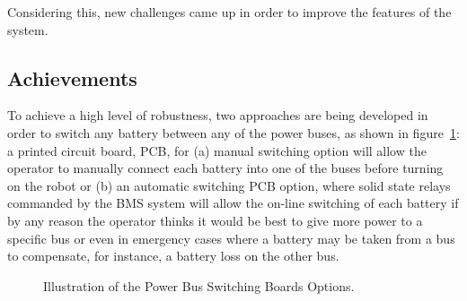 \documentclass{ifacconf}
\begin{document}
Considering this, new challenges came up in order to improve the features of
the system.

\subsection{Achievements}

To achieve a high level of robustness, two approaches are being developed in
order to switch any battery between any of the power buses, as shown in
figure~\ref{fig:DORIS-PCBs}: a printed circuit board, PCB, for (a) manual
switching option will allow the operator to manually connect each battery into
one of the buses before turning on the robot or (b) an automatic switching PCB
option, where solid state relays commanded by the BMS system will allow the
on-line switching of each battery if by any reason the operator thinks it would
be best to give more power to a specific bus or even in emergency cases where a
battery may be taken from a bus to compensate, for instance, a battery loss on
the other bus.

\begin{figure}[ht]
\centering
{}
\vspace{-.1cm}
\caption{Illustration of the Power Bus Switching Boards Options.}\vspace{-0.25cm}
\label{fig:DORIS-PCBs}
\end{figure}
\end{document}
